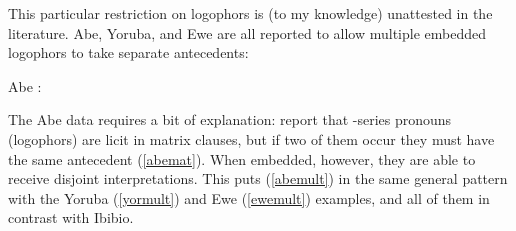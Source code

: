 \documentclass[output=paper]{langscibook}
\begin{document}
This particular restriction on logophors is (to my knowledge) unattested in the  literature. Abe, Yoruba, and Ewe are all reported to allow multiple embedded logophors to take separate antecedents:
\begin{exe}
	\ex Abe \citep[41, 44a]{Koopman1989}: \begin{xlist} 
		\label{abemat}
	\label{abemult}
			\end{xlist}
			
	\label{yormult}
			
	\label{ewemult}
\end{exe}
The Abe data requires a bit of explanation: \citet{Koopman1989} report that -series pronouns (logophors) are licit in matrix clauses, but if two of them occur they must have the same antecedent (\ref{abemat}). When embedded, however, they are able to receive disjoint interpretations. This puts (\ref{abemult}) in the same general pattern with the Yoruba (\ref{yormult}) and Ewe (\ref{ewemult}) examples, and all of them in contrast with Ibibio.
\end{document}
